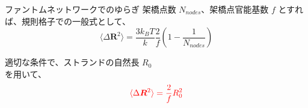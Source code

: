 \documentclass[11pt, dvipdfmx]{beamer}
\begin{document}
\begin{frame}
\begin{columns}[totalwidth=1\textwidth]
\begin{exampleblock}{ファントムネットワークでのゆらぎ}
架橋点数 $N_{nodes}$、架橋点官能基数 $f$ とすれば、規則格子での一般式として、
\vspace{-3mm}
\begin{equation*}
\langle \Delta \bm{R}^2 \rangle = \dfrac{3k_B T}{k} \dfrac{2}{f} \left( 1-\dfrac{1}{N_{nodes}} \right)
\end{equation*}

適切な条件で、ストランドの自然長 $R_0$\\
を用いて、
\vspace{-3mm}
\begin{equation*}
\color{red}
\langle \Delta \bm{R}^2 \rangle = \dfrac{2}{f} R_0^2
\end{equation*}
\vspace{-6mm}
\end{exampleblock}

\end{columns}

\end{frame}
\end{document}
